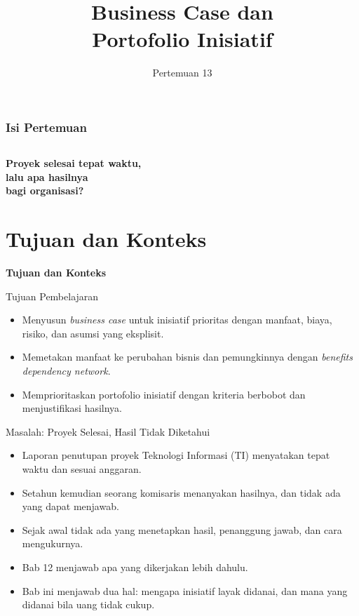 \documentclass[aspectratio=169, table, 12pt]{beamer}
\title{\Huge Business Case dan\\ \vspace{10pt} Portofolio Inisiatif}
\date{Pertemuan 13}
\begin{document}
\frame{\titlepage}

\begin{frame}
  \frametitle{Isi Pertemuan}
  \vspace{14pt}
  \begin{columns}[t]
    {\small\tableofcontents[sections={1-4}]}

    {\small\tableofcontents[sections={5-7}]}
  \end{columns}
\end{frame}

\begin{frame}{\hfill}
  \centering
  \Huge{\textbf{Proyek selesai tepat waktu,\\lalu apa hasilnya\\bagi organisasi?}}
\end{frame}

\section{Tujuan dan Konteks}

\begin{frame}{\hfill}
  \centering
  \Huge{\textbf{Tujuan dan Konteks}}
\end{frame}

\begin{frame}{{\Large Tujuan Pembelajaran}}
  \vspace{10pt}
  \begin{itemize}
    \item Menyusun \textit{business case} untuk inisiatif prioritas dengan manfaat, biaya, risiko, dan
          asumsi yang eksplisit.
    \item Memetakan manfaat ke perubahan bisnis dan pemungkinnya dengan \textit{benefits dependency
          network}.
    \item Memprioritaskan portofolio inisiatif dengan kriteria berbobot dan menjustifikasi hasilnya.
  \end{itemize}
\end{frame}

\begin{frame}{{\Large Masalah: Proyek Selesai, Hasil Tidak Diketahui}}
  \small
  \vspace{6pt}
  \begin{itemize}
    \item Laporan penutupan proyek Teknologi Informasi (TI) menyatakan tepat waktu dan sesuai anggaran.
    \item Setahun kemudian seorang komisaris menanyakan hasilnya, dan tidak ada yang dapat menjawab.
    \item Sejak awal tidak ada yang menetapkan hasil, penanggung jawab, dan cara mengukurnya.
    \item Bab 12 menjawab apa yang dikerjakan lebih dahulu.
    \item Bab ini menjawab dua hal: mengapa inisiatif layak didanai, dan mana yang didanai bila uang
          tidak cukup.
  \end{itemize}
\end{frame}
\end{document}

